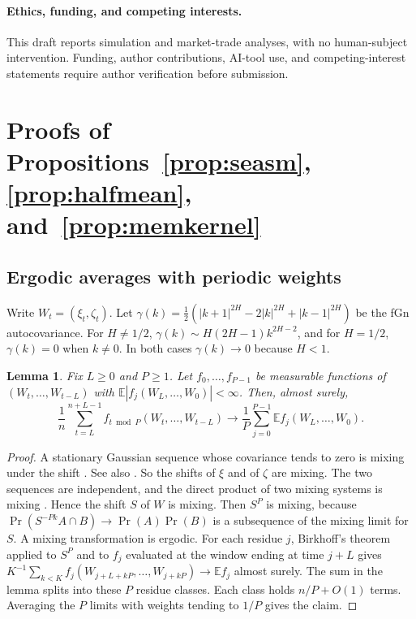 \documentclass[11pt]{article}
\newtheorem{lemma}{Lemma}
\theoremstyle{remark}
\newcommand{\E}{\mathbb E}
\begin{document}
\paragraph{Ethics, funding, and competing interests.} This draft reports simulation and market-trade analyses, with no human-subject intervention. Funding, author contributions, AI-tool use, and competing-interest statements require author verification before submission.

\appendix
\section{Proofs of Propositions~\ref{prop:seasm}, \ref{prop:halfmean}, and~\ref{prop:memkernel}}\label{sec:proofs}

\subsection{Ergodic averages with periodic weights}
Write $W_t=(\xi_t,\zeta_t)$. Let $\gamma(k)=\tfrac12(|k+1|^{2H}-2|k|^{2H}+|k-1|^{2H})$ be the fGn autocovariance. For $H\ne1/2$, $\gamma(k)\sim H(2H-1)k^{2H-2}$, and for $H=1/2$, $\gamma(k)=0$ when $k\ne0$. In both cases $\gamma(k)\to0$ because $H<1$.

\begin{lemma}\label{lem:ergodic}
Fix $L\ge0$ and $P\ge1$. Let $f_0,\ldots,f_{P-1}$ be measurable functions of $(W_t,\ldots,W_{t-L})$ with $\E|f_j(W_L,\ldots,W_0)|<\infty$. Then, almost surely,
\[
\frac1n\sum_{t=L}^{n+L-1}f_{t\bmod P}(W_t,\ldots,W_{t-L})\longrightarrow\frac1P\sum_{j=0}^{P-1}\E f_j(W_L,\ldots,W_0).
\]
\end{lemma}

\begin{proof}
A stationary Gaussian sequence whose covariance tends to zero is mixing under the shift \citep{maruyama1949harmonic}. See also \citet[Chapter~14]{cornfeld1982ergodic}. So the shifts of $\xi$ and of $\zeta$ are mixing. The two sequences are independent, and the direct product of two mixing systems is mixing \citep{walters1982introduction}. Hence the shift $S$ of $W$ is mixing. Then $S^P$ is mixing, because $\Pr(S^{-Pk}A\cap B)\to\Pr(A)\Pr(B)$ is a subsequence of the mixing limit for $S$. A mixing transformation is ergodic. For each residue $j$, Birkhoff's theorem applied to $S^P$ and to $f_j$ evaluated at the window ending at time $j+L$ gives $K^{-1}\sum_{k<K}f_j(W_{j+L+kP},\ldots,W_{j+kP})\to\E f_j$ almost surely. The sum in the lemma splits into these $P$ residue classes. Each class holds $n/P+O(1)$ terms. Averaging the $P$ limits with weights tending to $1/P$ gives the claim.
\end{proof}
\end{document}
